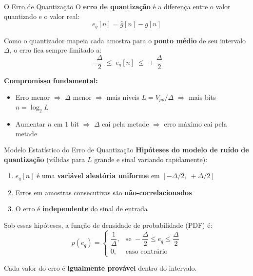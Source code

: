 \begin{frame}{O Erro de Quantização}
  O \textbf{erro de quantização} é a diferença entre o valor
  quantizado e o valor real:
  \[
    e_q[n] = \hat{g}[n] - g[n]
  \]

  \vspace{0.3cm}
  Como o quantizador mapeia cada amostra para o
  \textbf{ponto médio} de seu intervalo $\Delta$,
  o erro fica sempre limitado a:
  \[
    -\frac{\Delta}{2} \;\le\; e_q[n] \;\le\; +\frac{\Delta}{2}
  \]

  \vspace{0.4cm}
  \textbf{Compromisso fundamental:}
  \begin{itemize}
    \item Erro menor $\Rightarrow$ $\Delta$ menor
          $\Rightarrow$ mais níveis $L = V_{pp}/\Delta$
          $\Rightarrow$ mais bits $n = \log_2 L$
    \item Aumentar $n$ em 1 bit $\Rightarrow$ $\Delta$ cai pela metade
          $\Rightarrow$ erro máximo cai pela metade
  \end{itemize}
\end{frame}


\begin{frame}{Modelo Estatístico do Erro de Quantização}
  \textbf{Hipóteses do modelo de ruído de quantização}
  (válidas para $L$ grande e sinal variando rapidamente):

  \begin{enumerate}
    \item $e_q[n]$ é uma \textbf{variável aleatória uniforme} em
          $[-\Delta/2,\; +\Delta/2]$
    \item Erros em amostras consecutivas são \textbf{não-correlacionados}
    \item O erro é \textbf{independente} do sinal de entrada
  \end{enumerate}

  \vspace{0.3cm}
  Sob essas hipóteses, a função de densidade de probabilidade (PDF) é:
  \[
    p(e_q) =
    \begin{cases}
      \dfrac{1}{\Delta}, & \text{se } -\dfrac{\Delta}{2}
                            \le e_q \le \dfrac{\Delta}{2} \\[8pt]
      0,                 & \text{caso contrário}
    \end{cases}
  \]

  Cada valor do erro é \textbf{igualmente provável} dentro do intervalo.
\end{frame}

